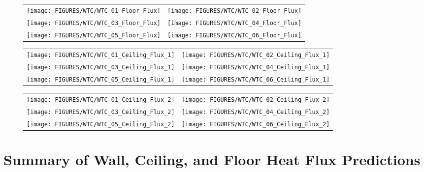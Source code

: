 \newpage

\begin{figure}[p]
\begin{tabular*}{\textwidth}{l@{\extracolsep{\fill}}r}
\texttt{[image: FIGURES/WTC/WTC\_01\_Floor\_Flux]} &
\texttt{[image: FIGURES/WTC/WTC\_02\_Floor\_Flux]} \\
\texttt{[image: FIGURES/WTC/WTC\_03\_Floor\_Flux]} &
\texttt{[image: FIGURES/WTC/WTC\_04\_Floor\_Flux]} \\
\texttt{[image: FIGURES/WTC/WTC\_05\_Floor\_Flux]} &
\texttt{[image: FIGURES/WTC/WTC\_06\_Floor\_Flux]}
\end{tabular*}
\label{NIST_WTC_Floor_Flux}
\end{figure}

\begin{figure}[p]
\begin{tabular*}{\textwidth}{l@{\extracolsep{\fill}}r}
\texttt{[image: FIGURES/WTC/WTC\_01\_Ceiling\_Flux\_1]} &
\texttt{[image: FIGURES/WTC/WTC\_02\_Ceiling\_Flux\_1]} \\
\texttt{[image: FIGURES/WTC/WTC\_03\_Ceiling\_Flux\_1]} &
\texttt{[image: FIGURES/WTC/WTC\_04\_Ceiling\_Flux\_1]} \\
\texttt{[image: FIGURES/WTC/WTC\_05\_Ceiling\_Flux\_1]} &
\texttt{[image: FIGURES/WTC/WTC\_06\_Ceiling\_Flux\_1]}
\end{tabular*}
\label{NIST_WTC_Ceiling_Flux_1}
\end{figure}

\begin{figure}[p]
\begin{tabular*}{\textwidth}{l@{\extracolsep{\fill}}r}
\texttt{[image: FIGURES/WTC/WTC\_01\_Ceiling\_Flux\_2]} &
\texttt{[image: FIGURES/WTC/WTC\_02\_Ceiling\_Flux\_2]} \\
\texttt{[image: FIGURES/WTC/WTC\_03\_Ceiling\_Flux\_2]} &
\texttt{[image: FIGURES/WTC/WTC\_04\_Ceiling\_Flux\_2]} \\
\texttt{[image: FIGURES/WTC/WTC\_05\_Ceiling\_Flux\_2]} &
\texttt{[image: FIGURES/WTC/WTC\_06\_Ceiling\_Flux\_2]}
\end{tabular*}
\label{NIST_WTC_Ceiling_Flux_2}
\end{figure}


\clearpage

\section{Summary of Wall, Ceiling, and Floor Heat Flux Predictions}

